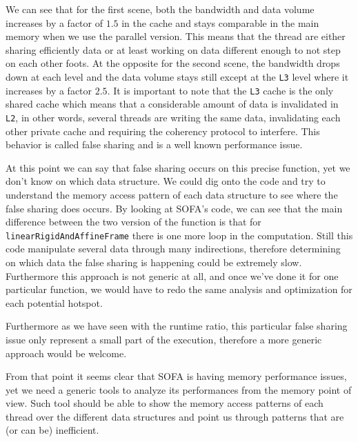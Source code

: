 We can see that for the first scene, both the bandwidth and data
volume increases by a factor of $1.5$ in the cache and stays comparable in the main memory when we
use the parallel version. This means that the thread are either sharing
efficiently data or at least working on data different enough to not step on
each other foots. At the opposite for the second scene, the bandwidth drops
down at each level and the data volume stays still except at the \texttt{L3}
level where it increases by a factor $2.5$. It is important to note that the
\texttt{L3} cache is the only shared cache which means that a considerable
amount of data is invalidated in \texttt{L2}, in other words, several threads
are writing the same data, invalidating each other private cache and requiring
the coherency protocol to interfere. This behavior is called false sharing and
is a well known performance issue.

At this point we can say that false sharing occurs on this precise function,
yet we don't know on which data structure. We could dig onto the code and try
to understand the memory access pattern of each data structure to see where
the false sharing does occurs. By looking at \gls{SOFA}'s code, we can see
that the main difference between the two version of the function is that for
\texttt{linearRigidAndAffineFrame} there is one more loop in the computation.
Still this code manipulate several data through many indirections, therefore
determining on which data the false sharing is happening could be extremely
slow. Furthermore this approach is not generic at all, and once we've done it
for one particular function, we would have to redo the same analysis and
optimization for each potential hotspot.

Furthermore as we have seen with the runtime ratio, this particular false
sharing issue only represent a small part of the execution, therefore a more
generic approach would be welcome.

From that point it seems clear that \gls{SOFA} is having memory performance
issues, yet we need a generic tools to analyze its performances from the
memory point of view. Such tool should be able to show the memory access
patterns of each thread over the different data structures and point us
through patterns that are (or can be) inefficient.
